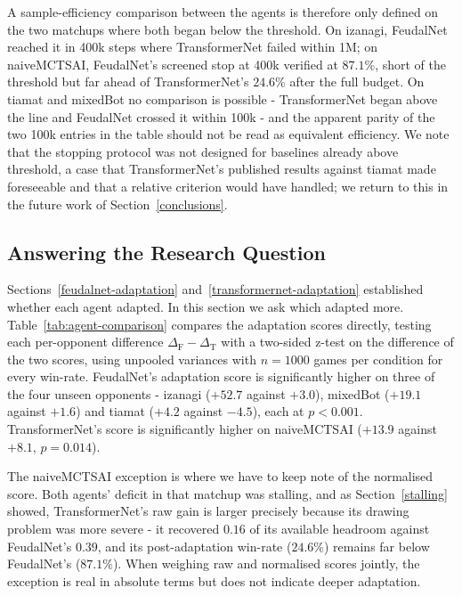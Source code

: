 \documentclass[sigconf,review=false]{acmart}
\begin{document}
A sample-efficiency comparison between the agents is therefore only defined on the two matchups where both began below the threshold. 
On izanagi, FeudalNet reached it in 400k steps where TransformerNet failed within 1M; on naiveMCTSAI, FeudalNet's screened stop at 400k verified at $87.1\%$, short of the threshold but far ahead of TransformerNet's $24.6\%$ after the full budget. 
On tiamat and mixedBot no comparison is possible - TransformerNet began above the line and FeudalNet crossed it within 100k - and the apparent parity of the two 100k entries in the table should not be read as equivalent efficiency. 
We note that the stopping protocol was not designed for baselines already above threshold, a case that TransformerNet's published results against tiamat made foreseeable and that a relative criterion would have handled; we return to this in the future work of Section~\ref{conclusions}.

\subsection{Answering the Research Question}
\label{ans-research}
Sections~\ref{feudalnet-adaptation} and~\ref{transformernet-adaptation} established whether each agent adapted. 
In this section we ask which adapted more. 
Table~\ref{tab:agent-comparison} compares the adaptation scores directly, testing each per-opponent difference $\Delta_{\mathrm{F}} - \Delta_{\mathrm{T}}$ with a two-sided z-test on the difference of the two scores, using unpooled variances with $n = 1000$ games per condition for every win-rate. 
FeudalNet's adaptation score is significantly higher on three of the four unseen opponents - izanagi ($+52.7$ against $+3.0$), mixedBot ($+19.1$ against $+1.6$) and tiamat ($+4.2$ against $-4.5$), each at $p < 0.001$. 
TransformerNet's score is significantly higher on naiveMCTSAI ($+13.9$ against $+8.1$, $p = 0.014$).

The naiveMCTSAI exception is where we have to keep note of the normalised score.
Both agents' deficit in that matchup was stalling, and as Section~\ref{stalling} showed, TransformerNet's raw gain is larger precisely because its drawing problem was more severe - it recovered $0.16$ of its available headroom against FeudalNet's $0.39$, and its post-adaptation win-rate ($24.6\%$) remains far below FeudalNet's ($87.1\%$). 
When weighing raw and normalised scores jointly, the exception is real in absolute terms but does not indicate deeper adaptation.
\end{document}
